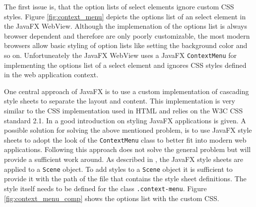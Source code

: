The first issue is, that the option lists of select elements ignore custom CSS styles. Figure \ref{fig:context_menu} depicts the options list of an select element in the JavaFX WebView. Although the implemenation of the options list is always browser dependent and therefore are only poorly customizable, the most modern browsers allow basic styling of option lists like setting the background color and so on. Unfortuneately the JavaFX WebView uses a JavaFX \texttt{ContextMenu} for implementing the options list of a select element and ignores CSS styles defined in the web application context. 

One central approach of JavaFX is to use a custom implementation of cascading style sheets to separate the layout and content. This implementation is very similar to the CSS implementation used in HTML and relies on the W3C CSS standard 2.1. In \autocite{impl:skinning-fx} a good introduction on styling JavaFX applications is given. A possible solution for solving the above mentioned problem, is to use JavaFX style sheets to adopt the look of the \texttt{ContextMenu} class to better fit into modern web applications. Following this approach does not solve the general problem but will provide a sufficient work around. As described in \autocite{impl:skinning-fx}, the JavaFX style sheets are applied to a \texttt{Scene} object. To add styles to a \texttt{Scene} object it is sufficient to provide it with the path of the file that contains the style sheet definitions. The style itself needs to be defined for the class \texttt{.context-menu}. Figure \ref{fig:context_menu_comp} shows the options list with the custom CSS.

